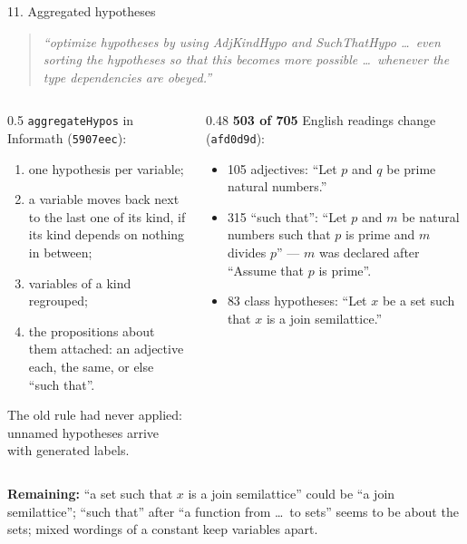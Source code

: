 \documentclass[10pt,aspectratio=169]{beamer}
\newcommand{\bad}[1]{\textcolor{warn}{#1}}
\newcommand{\ok}[1]{\textcolor{good}{#1}}
\newcommand{\commit}[1]{\texttt{\footnotesize #1}}
\newcommand{\prompt}[1]{\begin{quote}\small\itshape ``#1''\end{quote}}
\begin{document}
\begin{frame}{11. Aggregated hypotheses}
  \footnotesize
  \prompt{optimize hypotheses by using AdjKindHypo and SuchThatHypo \ldots\ even sorting
  the hypotheses so that this becomes more possible \ldots\ whenever the type
  dependencies are obeyed.}
  \begin{columns}[T]
    \begin{column}{0.5\textwidth}
      \texttt{aggregateHypos} in Informath (\commit{5907eec}):
      \begin{enumerate}
        \item one hypothesis per variable;
        \item a variable moves back next to the last one of its kind, if its kind
              depends on nothing in between;
        \item variables of a kind regrouped;
        \item the propositions about them attached: an adjective each, the same, or
              else ``such that''.
      \end{enumerate}
      The old rule had never applied: unnamed hypotheses arrive with generated labels.
    \end{column}
    \begin{column}{0.48\textwidth}
      \textbf{503 of 705} English readings change (\commit{afd0d9d}):
      \begin{itemize}
        \item 105 adjectives: ``Let $p$ and $q$ be \ok{prime natural numbers}.''
        \item 315 ``such that'': ``Let $p$ and $m$ be natural numbers \ok{such that}
              $p$ is prime and $m$ divides $p$'' --- $m$ was declared after ``Assume
              that $p$ is prime''.
        \item 83 class hypotheses: ``Let $x$ be a set such that $x$ is a join
              semilattice.''
      \end{itemize}
    \end{column}
  \end{columns}
  \textbf{Remaining:} \bad{``a set such that $x$ is a join semilattice''} could be ``a
  join semilattice''; ``such that'' after ``a function from \dots\ to sets'' seems to be
  about the sets; mixed wordings of a constant keep variables apart.
\end{frame}
\end{document}
